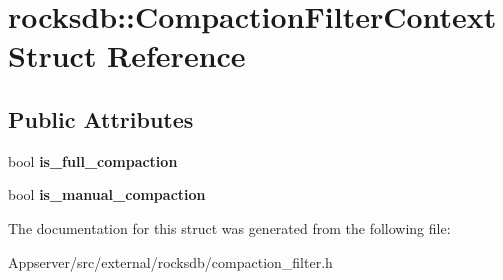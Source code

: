 \hypertarget{structrocksdb_1_1CompactionFilterContext}{}\section{rocksdb\+:\+:Compaction\+Filter\+Context Struct Reference}
\label{structrocksdb_1_1CompactionFilterContext}
\subsection*{Public Attributes}
\begin{DoxyCompactItemize}
\item 
bool {\bfseries is\+\_\+full\+\_\+compaction}\hypertarget{structrocksdb_1_1CompactionFilterContext_a20d92a989834e163b7b1ecac1490ce6a}{}\label{structrocksdb_1_1CompactionFilterContext_a20d92a989834e163b7b1ecac1490ce6a}

\item 
bool {\bfseries is\+\_\+manual\+\_\+compaction}\hypertarget{structrocksdb_1_1CompactionFilterContext_a6085fdf0527b0ddb1b851240f47c7f16}{}\label{structrocksdb_1_1CompactionFilterContext_a6085fdf0527b0ddb1b851240f47c7f16}

\end{DoxyCompactItemize}


The documentation for this struct was generated from the following file\+:\begin{DoxyCompactItemize}
\item 
Appserver/src/external/rocksdb/compaction\+\_\+filter.\+h\end{DoxyCompactItemize}

